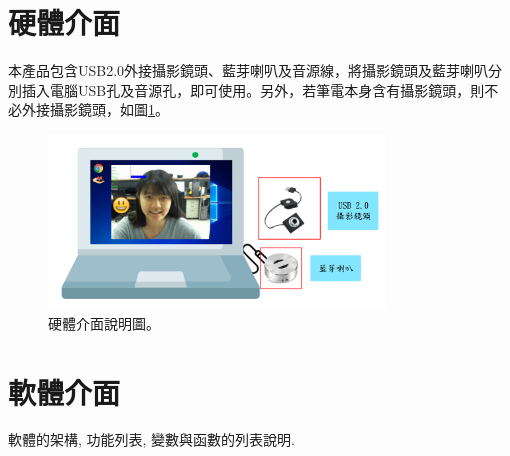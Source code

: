 \documentclass[12pt]{scrreprt}
\begin{document}
\section{硬體介面}
本產品包含USB2.0外接攝影鏡頭、藍芽喇叭及音源線，將攝影鏡頭及藍芽喇叭分別插入電腦USB孔及音源孔，即可使用。另外，若筆電本身含有攝影鏡頭，則不必外接攝影鏡頭，如圖\ref{fig:hardInterface}。
\begin{figure}[!h]
\begin{center}
\includegraphics[width=0.8\textwidth]{./figs/hardware.pdf}
\end{center}
\caption{硬體介面說明圖。}
\label{fig:hardInterface}
\end{figure}

\section{軟體介面}
軟體的架構, 功能列表, 變數與函數的列表說明.
\end{document}
